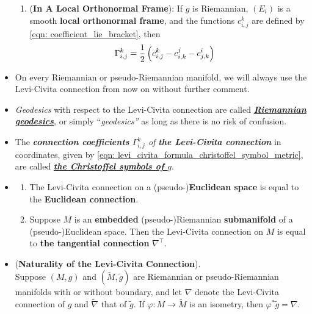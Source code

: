 \documentclass[11pt]{article}
\begin{document}
\begin{itemize}
\begin{corollary}
\begin{enumerate}
\item (\textbf{In A Local Orthonormal Frame}): If $g$ is Riemannian, $(E_i)$ is a smooth \textbf{local orthonormal frame}, and the functions $c_{i,j}^k$ are defined by \eqref{eqn: coefficient_lie_bracket}, then
\begin{align}
\Gamma_{i,j}^{k} &= \frac{1}{2}\left( c_{i,j}^{k} - c_{i,k}^{j} - c_{j,k}^{i} \right) \label{eqn: levi_civita_formula_christoffel_symbol_ortho_local_frames}
\end{align}
\end{enumerate}
\end{corollary}

\item \begin{remark}
On every Riemannian or pseudo-Riemannian manifold, we will always use the Levi-Civita connection from now on without further comment.
\end{remark}

\item \begin{remark}
\emph{Geodesics} with respect to the Levi-Civita connection are called \underline{\emph{\textbf{Riemannian geodesics}}}, or
simply ``\emph{geodesics”} as long as there is no risk of confusion. 
\end{remark}

\item \begin{remark}
The \emph{\textbf{connection coefficients} $\Gamma_{i,j}^{k}$ of \textbf{the Levi-Civita connection}} in coordinates, given by \eqref{eqn: levi_civita_formula_christoffel_symbol_metric}, are called \underline{\emph{\textbf{the Christoffel symbols of $g$}}}.
\end{remark}

\item \begin{proposition}
\begin{enumerate}
\item The Levi-Civita connection on a (pseudo-)\textbf{Euclidean space} is equal to the \textbf{Euclidean connection}.
\item Suppose $M$ is an \textbf{embedded} (pseudo-)Riemannian \textbf{submanifold} of a (pseudo-)Euclidean space. Then the Levi-Civita connection on $M$ is equal to\textbf{ the tangential connection} $\nabla^{\top}$.
\end{enumerate}
\end{proposition}

\item \begin{proposition} (\textbf{Naturality of the Levi-Civita Connection}). \citep{lee2018introduction}\\
Suppose $(M,g)$ and $(\widetilde{M}, \widetilde{g})$ are Riemannian or pseudo-Riemannian manifolds with or without boundary, and let $\nabla$ denote the Levi-Civita connection of $g$ and $\widetilde{\nabla}$ that of $\widetilde{g}$. If $\varphi: M \rightarrow \widetilde{M}$ is an isometry, then $\varphi^{*}\widetilde{g} = \nabla$.
\end{proposition}


\end{itemize}
\end{document}
